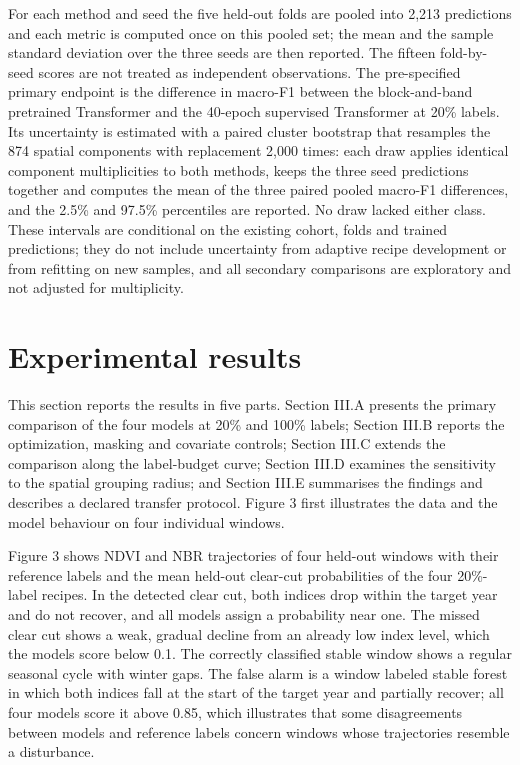 \documentclass[11pt,a4paper]{article}
\begin{document}
For each method and seed the five held-out folds are pooled into 2,213 predictions and each metric is computed once on this pooled set; the mean and the sample standard deviation over the three seeds are then reported. The fifteen fold-by-seed scores are not treated as independent observations. The pre-specified primary endpoint is the difference in macro-F1 between the block-and-band pretrained Transformer and the 40-epoch supervised Transformer at 20\% labels. Its uncertainty is estimated with a paired cluster bootstrap \cite{ref36} that resamples the 874 spatial components with replacement 2,000 times: each draw applies identical component multiplicities to both methods, keeps the three seed predictions together and computes the mean of the three paired pooled macro-F1 differences, and the 2.5\% and 97.5\% percentiles are reported. No draw lacked either class. These intervals are conditional on the existing cohort, folds and trained predictions; they do not include uncertainty from adaptive recipe development or from refitting on new samples, and all secondary comparisons are exploratory and not adjusted for multiplicity.

\section{Experimental results}
This section reports the results in five parts. Section III.A presents the primary comparison of the four models at 20\% and 100\% labels; Section III.B reports the optimization, masking and covariate controls; Section III.C extends the comparison along the label-budget curve; Section III.D examines the sensitivity to the spatial grouping radius; and Section III.E summarises the findings and describes a declared transfer protocol. Figure 3 first illustrates the data and the model behaviour on four individual windows.

Figure 3 shows NDVI and NBR trajectories of four held-out windows with their reference labels and the mean held-out clear-cut probabilities of the four 20\%-label recipes. In the detected clear cut, both indices drop within the target year and do not recover, and all models assign a probability near one. The missed clear cut shows a weak, gradual decline from an already low index level, which the models score below 0.1. The correctly classified stable window shows a regular seasonal cycle with winter gaps. The false alarm is a window labeled stable forest in which both indices fall at the start of the target year and partially recover; all four models score it above 0.85, which illustrates that some disagreements between models and reference labels concern windows whose trajectories resemble a disturbance.
\end{document}
